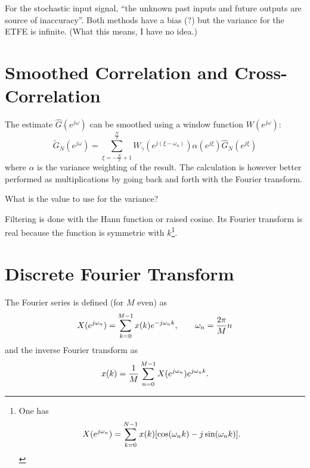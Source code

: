   For the stochastic input signal, ``the unknown past inputs and future outputs are source of inaccuracy''. Both methods have a bias (?) but the variance for the ETFE is infinite\cite{broersen}. (What this means, I have no idea.)


  \section{Smoothed Correlation and Cross-Correlation}
  \label{sec:smoothed-correlations}

  The estimate $\hat{G}(e^{j\omega})$ can be smoothed using a window function $W(e^{j\omega})$:
  \begin{equation*}
    \tilde{G}_N(e^{j\omega}) = \sum_{\xi=-\frac{N}{2}+1}^{\frac{N}{2}} W_\gamma(e^{j(\xi-\omega_n)}) \alpha(e^{j\xi}) \hat{G}_N(e^{j\xi})
  \end{equation*}
  where $\alpha$ is the variance weighting of the result. The calculation is however better performed as multiplications by going back and forth with the Fourier transform.

  What is the value to use for the variance?

  Filtering is done with the Hann function or raised cosine. Its Fourier transform is real because the function is symmetric with $k$\footnote{One has
    \begin{equation*}
      X(e^{j\omega_n}) = \sum_{k=0}^{N-1} x(k)[\cos(\omega_nk) - j\sin(\omega_nk)].
    \end{equation*}
  }.
\fi

\section{Discrete Fourier Transform}
\label{sec:DFT}

The Fourier series is defined (for $M$ even) as
\begin{equation}
  \label{eq:fourier-transform}
  X(\ejwn) = \sum_{k=0}^{M-1} x(k) \emjwn[k],\hspace{2em} \omega_n = \frac{2\pi}{M}n
\end{equation}
and the inverse Fourier transform as
\begin{equation}
  \label{eq:inverse-fourier-transform}
  x(k) = \frac{1}{M}\sum_{n=0}^{M-1} X(\ejwn) \ejwn[k].
\end{equation}

